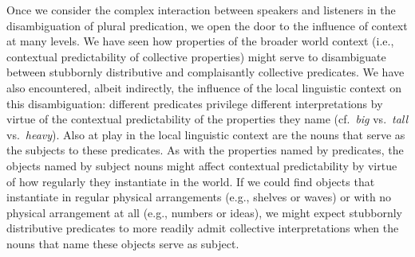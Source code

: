 \documentclass[linguex]{sp}
\begin{document}
Once we consider the complex interaction between speakers and listeners in the disambiguation of plural predication, we open the door to the influence of context at many levels. We have seen how properties of the broader world context (i.e., contextual predictability of collective properties) might serve to disambiguate between stubbornly distributive and complaisantly collective predicates. We have also encountered, albeit indirectly, the influence of the local linguistic context on this disambiguation: different predicates privilege different interpretations by virtue of the contextual predictability of the properties they name (cf.~\emph{big} vs.~\emph{tall} vs.~\emph{heavy}). Also at play in the local linguistic context are the nouns that serve as the subjects to these predicates. As with the properties named by  predicates, the objects named by  subject nouns might affect contextual predictability by virtue of how regularly they instantiate in the world. If we could find objects that instantiate in regular physical arrangements (e.g., shelves or waves) or with no physical arrangement at all (e.g., numbers or ideas), we might expect stubbornly distributive predicates to more readily admit collective interpretations when the nouns that name these objects serve as subject. %
\end{document}

